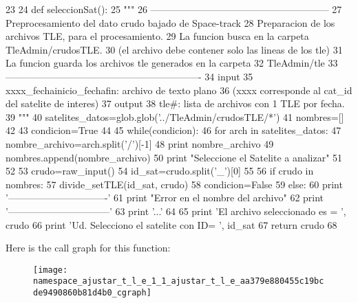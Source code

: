 \begin{DoxyCode}
23 
24 def seleccionSat():
25     """
26     --------------------------------------------------------
27     Preprocesamiento del dato crudo bajado de Space-track
28     Preparacion de los archivos TLE, para el procesamiento.
29     La funcion busca en la carpeta TleAdmin/crudosTLE.
30     (el archivo debe contener solo las lineas de los tle)
31     La funcion guarda los archivos tle generados en la carpeta
32     TleAdmin/tle
33     -------------------------------------------------------------
34     input
35         xxxx_fechainicio_fechafin:  archivo de texto plano 
36         (xxxx corresponde al cat_id del satelite de interes)
37     output
38         tle#: lista de archivos con 1 TLE por fecha.
39     """
40     satelites_datos=glob.glob('../TleAdmin/crudosTLE/*')
41     nombres=[]
42  
43     condicion=True
44      
45     while(condicion):
46         for arch in satelites_datos:
47             nombre_archivo=arch.split('/')[-1]
48             print nombre_archivo
49             nombres.append(nombre_archivo)
50         print "Seleccione el Satelite a analizar"
51         
52         
53         crudo=raw_input()
54         id_sat=crudo.split('_')[0]
55          
56         if crudo in nombres:
57             divide_setTLE(id_sat, crudo)
58             condicion=False
59         else:
60             print '-------------------------------'
61             print "Error en el nombre del archivo"
62             print '--------------------------------'
63             print '...'
64          
65     print 'El archivo seleccionado es = ', crudo
66     print 'Ud. Selecciono el satelite con ID= ', id_sat  
67     return crudo
68 

\end{DoxyCode}


\-Here is the call graph for this function\-:\nopagebreak
\begin{figure}[H]
\begin{center}
\leavevmode
\texttt{[image: namespace\_ajustar\_t\_l\_e\_1\_1\_ajustar\_t\_l\_e\_aa379e880455c19bcde9490860b81d4b0\_cgraph]}
\end{center}
\end{figure}


